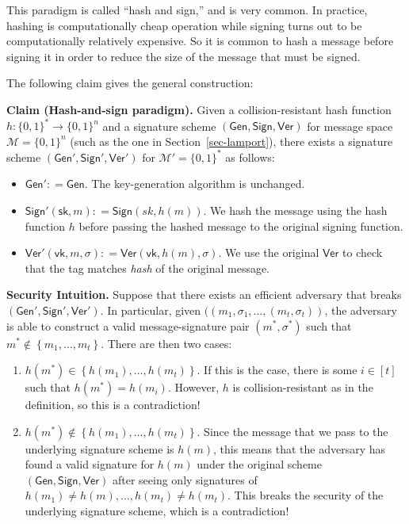 \documentclass[
  letterpaper,
]{scrbook}
\providecommand{\tightlist}{%
  \setlength{\itemsep}{0pt}\setlength{\parskip}{0pt}}
\newcommand{\zo}{\{0,1\}}
\newcommand{\bin}{\zo}
\newcommand{\calM}{\mathcal{M}}
\newcommand{\deq}{\mathrel{\mathop:}=}
\newcommand{\set}[1]{\left\{ #1 \right\}}
\newcommand{\Gen}{\mathsf{Gen}}
\newcommand{\Sign}{\mathsf{Sign}}
\newcommand{\Ver}{\mathsf{Ver}}
\newcommand{\sk}{\mathsf{sk}}
\newcommand{\vk}{\mathsf{vk}}
\newcommand{\sig}{\sigma}
\theoremstyle{definition}
\theoremstyle{plain}
\theoremstyle{plain}
\theoremstyle{remark}
\begin{document}

This paradigm is called ``hash and sign,'' and is very common. In
practice, hashing is computationally cheap operation while signing turns
out to be computationally relatively expensive. So it is common to hash
a message before signing it in order to reduce the size of the message
that must be signed.

The following claim gives the general construction:

\textbf{Claim (Hash-and-sign paradigm).} Given a collision-resistant
hash function \(h: \bin^* \rightarrow \bin^{n}\) and a signature scheme
\((\Gen, \Sign, \Ver)\) for message space \(\calM = \bin^n\) (such as
the one in Section~\ref{sec-lamport}), there exists a signature scheme
\((\Gen', \Sign', \Ver')\) for \(\calM' = \bin^*\) as follows:

\begin{itemize}
\tightlist
\item
  \(\Gen' \deq \Gen\). The key-generation algorithm is unchanged.
\item
  \(\Sign'(\sk, m) \deq \Sign(sk, h(m))\). We hash the message using the
  hash function \(h\) before passing the hashed message to the original
  signing function.
\item
  \(\Ver'(\vk, m, \sig) \deq \Ver(\vk, h(m), \sig)\). We use the
  original \(\Ver\) to check that the tag matches \emph{hash} of the
  original message.
\end{itemize}

\textbf{Security Intuition.} Suppose that there exists an efficient
adversary that breaks \((\Gen', \Sign', \Ver')\). In particular, given
\(((m_1, \sig_1, \ldots, (m_t, \sig_t))\), the adversary is able to
construct a valid message-signature pair \((m^*, \sig^*)\) such that
\(m^* \notin \set{m_1, \ldots, m_t}\). There are then two cases:

\begin{enumerate}
\def\labelenumi{\arabic{enumi}.}
\tightlist
\item
  \(h(m^*) \in \set{h(m_1), \ldots, h(m_t)}\). If this is the case,
  there is some \(i \in [t]\) such that \(h(m^*) = h(m_i)\). However,
  \(h\) is collision-resistant as in the definition, so this is a
  contradiction!
\item
  \(h(m^*) \notin \set{h(m_1), \ldots, h(m_t)}\). Since the message that
  we pass to the underlying signature scheme is \(h(m)\), this means
  that the adversary has found a valid signature for \(h(m)\) under the
  original scheme \((\Gen, \Sign, \Ver)\) after seeing only signatures
  of \(h(m_1)\neq h(m), \ldots, h(m_t)\neq h(m_t)\). This breaks the
  security of the underlying signature scheme, which is a contradiction!
\end{enumerate}
\end{document}

